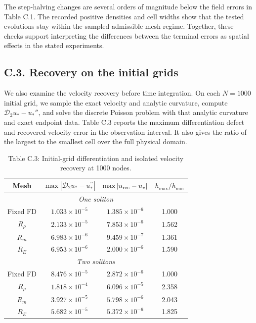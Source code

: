 \documentclass{article}
\begin{document}
The step-halving changes are several orders of magnitude below the field errors in Table C.1. The recorded positive densities and cell widths show that the tested evolutions stay within the sampled admissible mesh regime. Together, these checks support interpreting the differences between the terminal errors as spatial effects in the stated experiments.

\subsection*{C.3. Recovery on the initial grids}
\label{app:recovery}

We also examine the velocity recovery before time integration. On each \(N=1000\) initial grid, we sample the exact velocity and analytic curvature, compute \(\mathcal D_2u_*-u_*''\), and solve the discrete Poisson problem with that analytic curvature and exact endpoint data. Table C.3 reports the maximum differentiation defect and recovered velocity error in the observation interval. It also gives the ratio of the largest to the smallest cell over the full physical domain.

\begin{table}[!htbp]
\centering
\caption*{Table C.3: Initial-grid differentiation and isolated velocity recovery at 1000 nodes.}
\normalsize\setlength{\tabcolsep}{6pt}\renewcommand{\arraystretch}{1.25}\setlength{\extrarowheight}{1pt}
\begin{tabular}{cccc}
\hline
\multicolumn{1}{c}{Mesh} & \multicolumn{1}{c}{$\max|\mathcal D_2u_*-u_*^{\prime\prime}|$} & \multicolumn{1}{c}{$\max|u_{\rm rec}-u_*|$} & \multicolumn{1}{c}{$h_{\max}/h_{\min}$} \\
\hline
\multicolumn{4}{c}{\textit{One soliton}} \\
Fixed FD & $1.033\times10^{-5}$ & $1.385\times10^{-6}$ & 1.000 \\
$R_\rho$ & $2.133\times10^{-5}$ & $7.853\times10^{-6}$ & 1.562 \\
$R_m$ & $6.983\times10^{-6}$ & $9.459\times10^{-7}$ & 1.361 \\
$R_E$ & $6.953\times10^{-6}$ & $2.000\times10^{-6}$ & 1.590 \\
\hline
\multicolumn{4}{c}{\textit{Two solitons}} \\
Fixed FD & $8.476\times10^{-5}$ & $2.872\times10^{-6}$ & 1.000 \\
$R_\rho$ & $1.818\times10^{-4}$ & $6.096\times10^{-5}$ & 2.358 \\
$R_m$ & $3.927\times10^{-5}$ & $5.798\times10^{-6}$ & 2.043 \\
$R_E$ & $5.682\times10^{-5}$ & $5.372\times10^{-6}$ & 1.825 \\

\hline
\end{tabular}
\end{table}
\end{document}
